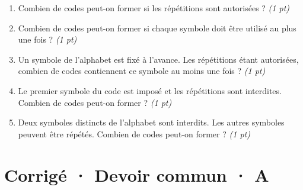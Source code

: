 \begin{enumerate}

\item Combien de codes peut-on former si les répétitions sont autorisées ? \hfill\textit{(1 pt)}

\item Combien de codes peut-on former si chaque symbole doit être utilisé au plus une fois ? \hfill\textit{(1 pt)}

\item Un symbole de l'alphabet est fixé à l'avance. Les répétitions étant autorisées, combien de codes contiennent ce symbole au moins une fois ? \hfill\textit{(1 pt)}

\item Le premier symbole du code est imposé et les répétitions sont interdites. Combien de codes peut-on former ? \hfill\textit{(1 pt)}

\item Deux symboles distincts de l'alphabet sont interdits. Les autres symboles peuvent être répétés. Combien de codes peut-on former ? \hfill\textit{(1 pt)}

\end{enumerate}

\ifprof\clearpage

\section*{Corrigé · Devoir commun · A}\label{cor:3-3}

